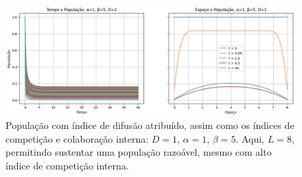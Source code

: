 \documentclass{article}
\begin{document}
 	\begin{figure}[h]
 		\centering
 		\includegraphics[scale=0.35]{L8-alpha1-beta5-D2}
 		\caption{População com índice de difusão atribuído, assim como os índices de competição e colaboração interna: $D=1$, $\alpha=1$, $\beta=5$. Aqui, $L=8$, permitindo sustentar uma população razoável, mesmo com alto índice de competição interna.}
 		\label{fig:L8-alpha1-beta5-D2}
 	\end{figure}
 
\end{document}
